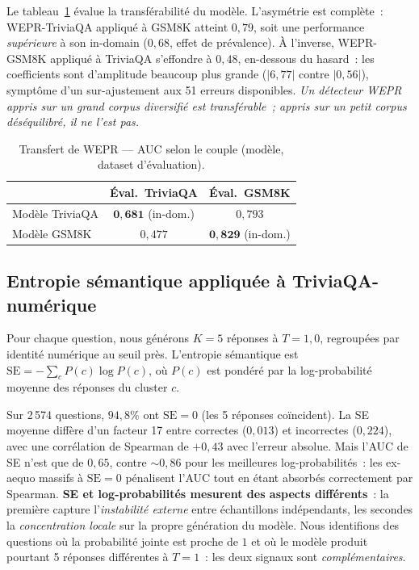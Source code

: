 \documentclass[12pt,a4paper]{article}
\begin{document}
Le tableau~\ref{tab:transfer_wepr} évalue la transférabilité du modèle. L'asymétrie est complète~: WEPR-TriviaQA appliqué à GSM8K atteint $0{,}79$, soit une performance \emph{supérieure} à son in-domain ($0{,}68$, effet de prévalence). À l'inverse, WEPR-GSM8K appliqué à TriviaQA s'effondre à $0{,}48$, en-dessous du hasard~: les coefficients sont d'amplitude beaucoup plus grande ($|6{,}77|$ contre $|0{,}56|$), symptôme d'un sur-ajustement aux 51 erreurs disponibles. \emph{Un détecteur WEPR appris sur un grand corpus diversifié est transférable~; appris sur un petit corpus déséquilibré, il ne l'est pas.}

\begin{table}[H]
\centering
\caption{Transfert de WEPR — AUC selon le couple (modèle, dataset d'évaluation).}
\label{tab:transfer_wepr}
\small
\begin{tabular}{lcc}
\toprule
                              & Éval.\ TriviaQA & Éval.\ GSM8K \\
\midrule
Modèle TriviaQA               & $\mathbf{0{,}681}$ (in-dom.) & $0{,}793$ \\
Modèle GSM8K                  & $0{,}477$ & $\mathbf{0{,}829}$ (in-dom.) \\
\bottomrule
\end{tabular}
\end{table}

\subsection{Entropie sémantique appliquée à TriviaQA-numérique}

Pour chaque question, nous générons $K=5$ réponses à $T=1{,}0$, regroupées par identité numérique au seuil près. L'entropie sémantique est $\mathrm{SE} = -\sum_c P(c)\log P(c)$, où $P(c)$ est pondéré par la log-probabilité moyenne des réponses du cluster $c$.

Sur 2\,574 questions, $94{,}8\%$ ont $\mathrm{SE} = 0$ (les 5 réponses coïncident). La SE moyenne diffère d'un facteur 17 entre correctes ($0{,}013$) et incorrectes ($0{,}224$), avec une corrélation de Spearman de $+0{,}43$ avec l'erreur absolue. Mais l'AUC de SE n'est que de $0{,}65$, contre $\sim 0{,}86$ pour les meilleures log-probabilités~: les ex-aequo massifs à $\mathrm{SE}=0$ pénalisent l'AUC tout en étant absorbés correctement par Spearman. \textbf{SE et log-probabilités mesurent des aspects différents}~: la première capture l'\emph{instabilité externe} entre échantillons indépendants, les secondes la \emph{concentration locale} sur la propre génération du modèle. Nous identifions des questions où la probabilité jointe est proche de $1$ et où le modèle produit pourtant 5 réponses différentes à $T=1$~: les deux signaux sont \emph{complémentaires}.
\end{document}

